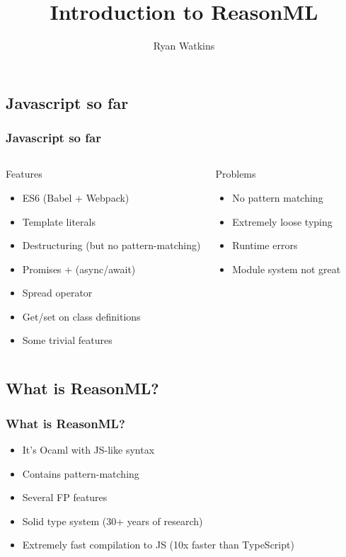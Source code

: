 \documentclass{beamer}
\author{Ryan Watkins}
\title{Introduction to ReasonML}
\begin{document}
\begin{frame}
  \titlepage
\end{frame}

\begin{frame}
  \section{Javascript so far}
  \frametitle{Javascript so far}
  \pause
  \begin{columns}
    \begin{block}{Features}
      \begin{itemize}
      \item ES6 (Babel + Webpack)
        \pause
      \item Template literals
        \pause
      \item Destructuring (but no pattern-matching)
        \pause
      \item Promises + (async/await)
        \pause
      \item Spread operator
        \pause
      \item Get/set on class definitions
        \pause
      \item Some trivial features
      \end{itemize}
    \end{block}
    \begin{block}{Problems}
      \begin{itemize}
      \item No pattern matching
        \pause
      \item Extremely loose typing
        \pause
      \item Runtime errors
        \pause
      \item Module system not great
      \end{itemize}
    \end{block}
  \end{columns}
\end{frame}

\begin{frame}
  \section{What is ReasonML?}
  \frametitle{What is ReasonML?}
  \pause
  \begin{itemize}
  \item It's Ocaml with JS-like syntax
    \pause
  \item Contains pattern-matching
    \pause
  \item Several FP features
    \pause
  \item Solid type system (30+ years of research)
    \pause
  \item Extremely fast compilation to JS (10x faster than TypeScript)
    \pause
  \end{itemize}
\end{frame}
\end{document}
